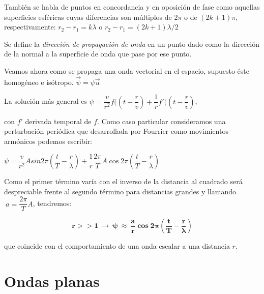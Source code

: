 También se habla de puntos en concordancia y en oposición de fase como aquellas superficies esféricas cuyas diferencias son múltiplos de $2\pi$ o de $(2k+1)\pi$, respectivamente: $r_2-r_1=k\lambda$ o $r_2-r_1=(2k+1)\lambda/2$

Se define la \emph{dirección de propagación de onda} en un punto dado como la dirección de la normal a la superficie de onda que pase por ese punto.

Veamos ahora como se propaga una onda vectorial en el espacio, supuesto éste homogéneo e isótropo. $\vec \psi=\psi \vec u$

La solución más general es $ \psi=\dfrac v{r^2} f(\left( t-\dfrac r v \right) + \dfrac 1 r f'(\left( t-\dfrac r v \right)$, 

con $f'$ derivada temporal de $f$. Como caso particular consideramos una perturbación periódica que desarrollada por Fourrier como movimientos armónicos podemos escribir:

$\psi  = \dfrac v{r^2} A sin 2\pi \left( \dfrac t T - \dfrac r \lambda \right)+\dfrac 1 r \dfrac {2\pi}{T} A \cos 2 \pi \left( \dfrac t T - \dfrac r \lambda \right)$

Como el primer término varía con el inverso de la distancia al cuadrado será despreciable frente al segundo término para distancias grandes y llamando $\ a=\dfrac{2\pi}{T} A$, tendremos:

\begin{equation}
\label{ondas-esfericas-grandes-distancias}
\boldsymbol{ r>>1 \ \to \  \psi \ \approx \ \dfrac a r \cos 2\pi \left( \dfrac t T - \dfrac r \lambda \right) }
\end{equation}

que coincide con el comportamiento de una onda escalar a una distancia $r$.
\vspace{10mm}  %
\section{Ondas planas}

